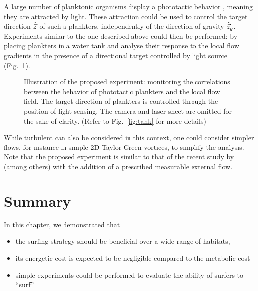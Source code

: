 A large number of planktonic organisms display a phototactic behavior \citep{tranter1981nocturnal, wilhelmus2014observations}, meaning they are attracted by light.
These attraction could be used to control the target direction $\hat{\vec{z}}$ of such a plankters, independently of the direction of gravity $\hat{\vec{z}}_g$.
Experiments similar to the one described above could then be performed: by placing plankters in a water tank and analyse their response to the local flow gradients in the presence of a directional target controlled by light source (Fig.~\ref{fig:phototactic_tank}).
\begin{figure}%
	\centering
	\def\svgwidth{0.9\textwidth}
	
	\caption[Illustration of the proposed experiment: monitoring the correlations between the behavior of phototactic plankters and the local flow field.]{
		Illustration of the proposed experiment: monitoring the correlations between the behavior of phototactic plankters and the local flow field.
		The target direction of plankters is controlled through the position of light sensing.
		The camera and laser sheet are omitted for the sake of clarity. (Refer to Fig.~\ref{fig:tank} for more details)
	}
	\label{fig:phototactic_tank}
\end{figure}

While turbulent can also be considered in this context, one could consider simpler flows, for instance in simple 2D Taylor-Green vortices, to simplify the analysis.
Note that the proposed experiment is similar to that of the recent study by \citet{houghton2018vertically} (among others) with the addition of a prescribed measurable external flow.

\section{Summary}

In this chapter, we demonstrated that
\begin{itemize}
	\item the surfing strategy should be beneficial over a wide range of habitats,
	\item its energetic cost is expected to be negligible compared to the metabolic cost
	\item simple experiments could be performed to evaluate the ability of surfers to ``surf''
\end{itemize}
